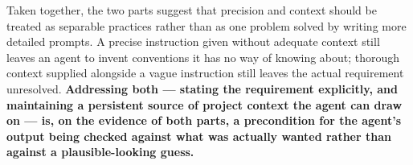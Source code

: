 Taken together, the two parts suggest that precision and context should be treated as separable practices rather than as one problem solved by writing more detailed prompts. A precise instruction given without adequate context still leaves an agent to invent conventions it has no way of knowing about; thorough context supplied alongside a vague instruction still leaves the actual requirement unresolved. \textbf{Addressing both --- stating the requirement explicitly, and maintaining a persistent source of project context the agent can draw on --- is, on the evidence of both parts, a precondition for the agent's output being checked against what was actually wanted rather than against a plausible-looking guess.}

